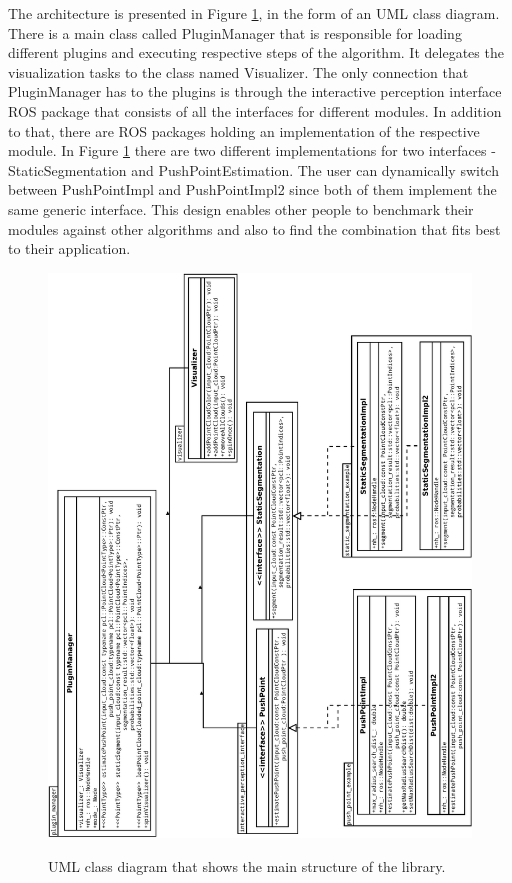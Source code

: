 The architecture is presented in Figure \ref{fig:uml}, in the form of an UML class diagram. There is a main class called PluginManager that is responsible for loading different plugins and executing respective steps of the algorithm. It delegates the visualization tasks to the class named Visualizer. The only connection that PluginManager has to the plugins is through the interactive perception interface ROS package that consists of all the interfaces for different modules. In addition to that, there are ROS packages holding an implementation of the respective module. In Figure \ref{fig:uml} there are two different implementations for two interfaces - StaticSegmentation and PushPointEstimation. The user can dynamically switch between PushPointImpl and PushPointImpl2 since both of them implement the same generic interface. This design enables other people to benchmark their modules against other algorithms and also to find the combination that fits best to their application.  

\begin{figure}
{\includegraphics[width=0.9\columnwidth, angle=-90]{figures/uml-after.pdf}}

\caption{UML class diagram that shows the main structure of the library.}
\label{fig:uml}
\end{figure}




